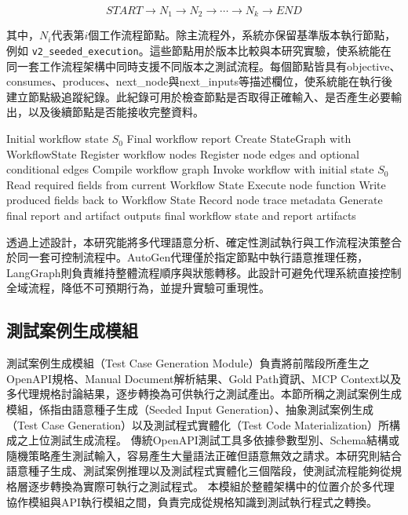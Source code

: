 \begin{ZhChapter}
\begin{equation}
START
\rightarrow
N_1
\rightarrow
N_2
\rightarrow
\cdots
\rightarrow
N_k
\rightarrow
END
\end{equation}

\text 其中，$N_i$代表第$i$個工作流程節點。除主流程外，系統亦保留基準版本執行節點，例如 \texttt{v2\_seeded\_execution}。這些節點用於版本比較與本研究實驗，使系統能在同一套工作流程架構中同時支援不同版本之測試流程。每個節點皆具有objective、consumes、produces、next\_node與next\_inputs等描述欄位，使系統能在執行後建立節點級追蹤紀錄。此紀錄可用於檢查節點是否取得正確輸入、是否產生必要輸出，以及後續節點是否能接收完整資料。

\begin{algorithm}[H]
\caption{工作流程引擎執行流程}
\label{alg:workflow_engine_execution}
\begin{algorithmic}[1]
\REQUIRE Initial workflow state $S_0$
\ENSURE Final workflow report
\STATE Create StateGraph with WorkflowState
\STATE Register workflow nodes
\STATE Register node edges and optional conditional edges
\STATE Compile workflow graph
\STATE Invoke workflow with initial state $S_0$
    \STATE Read required fields from current Workflow State
    \STATE Execute node function
    \STATE Write produced fields back to Workflow State
    \STATE Record node trace metadata
\ENDFOR
\STATE Generate final report and artifact outputs
\RETURN final workflow state and report artifacts
\end{algorithmic}
\end{algorithm}

\text 透過上述設計，本研究能將多代理語意分析、確定性測試執行與工作流程決策整合於同一套可控制流程中。AutoGen代理僅於指定節點中執行語意推理任務，LangGraph則負責維持整體流程順序與狀態轉移。此設計可避免代理系統直接控制全域流程，降低不可預期行為，並提升實驗可重現性。

\subsection{測試案例生成模組}
\text 測試案例生成模組（Test Case Generation Module）負責將前階段所產生之OpenAPI規格、Manual Document解析結果、Gold Path資訊、MCP Context以及多代理規格討論結果，逐步轉換為可供執行之測試產出。本節所稱之測試案例生成模組，係指由語意種子生成（Seeded Input Generation）、抽象測試案例生成（Test Case Generation）以及測試程式實體化（Test Code Materialization）所構成之上位測試生成流程。
\text 傳統OpenAPI測試工具多依據參數型別、Schema結構或隨機策略產生測試輸入，容易產生大量語法正確但語意無效之請求。本研究則結合語意種子生成、測試案例推理以及測試程式實體化三個階段，使測試流程能夠從規格層逐步轉換為實際可執行之測試程式。
\text 本模組於整體架構中的位置介於多代理協作模組與API執行模組之間，負責完成從規格知識到測試執行程式之轉換。


\end{ZhChapter}
